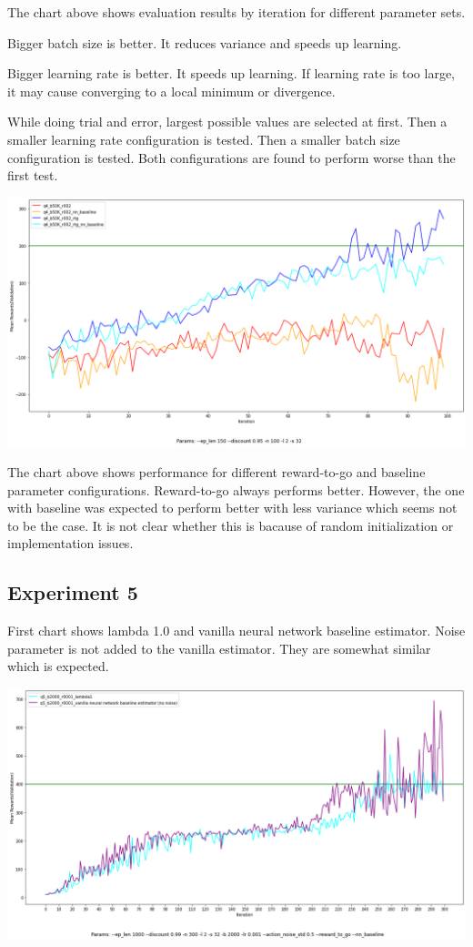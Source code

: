 \documentclass[11pt]{article}
\begin{document}
    The chart above shows evaluation results by iteration for different parameter sets.

    Bigger batch size is better.
    It reduces variance and speeds up learning.

    Bigger learning rate is better.
    It speeds up learning.
    If learning rate is too large, it may cause converging to a local minimum or divergence.

    While doing trial and error, largest possible values are selected at first.
    Then a smaller learning rate configuration is tested.
    Then a smaller batch size configuration is tested.
    Both configurations are found to perform worse than the first test.

    \hspace*{-0.75in}
    \includegraphics[scale=0.35]{q4/q4_rtg_baseline_comparison}

    The chart above shows performance for different reward-to-go and baseline parameter configurations.
    Reward-to-go always performs better.
    However, the one with baseline was expected to perform better with less variance which seems not to be the case.
    It is not clear whether this is bacause of random initialization or implementation issues.


    \subsection{Experiment 5}

    First chart shows lambda 1.0 and vanilla neural network baseline estimator.
    Noise parameter is not added to the vanilla estimator.
    They are somewhat similar which is expected.

    \hspace*{-0.75in}
    \includegraphics[scale=0.35]{q5/q5_lambda1_vs_vanilla}
\end{document}
